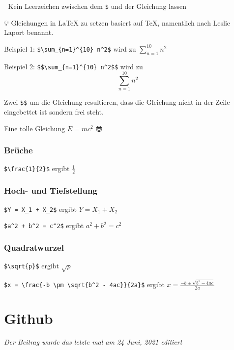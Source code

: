 \documentclass[
]{article}
\begin{document}
🚨 Kein Leerzeichen zwischen dem \texttt{\$} und der Gleichung lassen

💡 Gleichungen in LaTeX zu setzen basiert auf TeX, namentlich nach Leslie Laport benannt.

Beispiel 1: \texttt{\$\textbackslash{}sum\_\{n=1\}\^{}\{10\}\ n\^{}2\$} wird zu \(\sum_{n=1}^{10} n^2\)

Beispiel 2: \texttt{\$\$\textbackslash{}sum\_\{n=1\}\^{}\{10\}\ n\^{}2\$\$} wird zu \[\sum_{n=1}^{10} n^2\]

Zwei \texttt{\$\$} um die Gleichung resultieren, dass die Gleichung nicht in der Zeile eingebettet ist sondern frei steht.

Eine tolle Gleichung \(E=mc^2\) 😎

\hypertarget{bruxfcche}{%
\subsubsection{Brüche}\label{bruxfcche}}

\texttt{\$\textbackslash{}frac\{1\}\{2\}\$} ergibt \(\frac{1}{2}\)

\hypertarget{hoch--und-tiefstellung}{%
\subsubsection{Hoch- und Tiefstellung}\label{hoch--und-tiefstellung}}

\texttt{\$Y\ =\ X\_1\ +\ X\_2\$} ergibt \(Y = X_1 + X_2\)

\texttt{\$a\^{}2\ +\ b\^{}2\ =\ c\^{}2\$} ergibt \(a^2 + b^2 = c^2\)

\hypertarget{quadratwurzel}{%
\subsubsection{Quadratwurzel}\label{quadratwurzel}}

\texttt{\$\textbackslash{}sqrt\{p\}\$} ergibt \(\sqrt{p}\)

\texttt{\$x\ =\ \textbackslash{}frac\{-b\ \textbackslash{}pm\ \textbackslash{}sqrt\{b\^{}2\ -\ 4ac\}\}\{2a\}\$} ergibt \(x = \frac{-b \pm \sqrt{b^2 - 4ac}}{2a}\)

\hypertarget{github}{%
\section{Github}\label{github}}

\emph{Der Beitrag wurde das letzte mal am 24 Juni, 2021 editiert}
\end{document}
